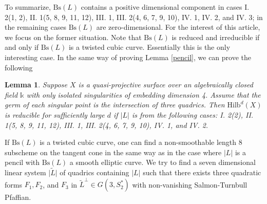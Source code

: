 \documentclass{amsart}[12pt]
\newtheorem{lemma}[theorem]{Lemma}
\theoremstyle{definition}
\theoremstyle{remark}
\numberwithin{equation}{section}
\newcommand{\abs}[1]{\lvert#1\rvert}
\begin{document}
To summarize, $\mathrm{Bs}(L)$ contains a positive dimensional component in cases I. 2(1, 2), II. 1(5, 8, 9, 11, 12), III. 1, III. 2(4, 6, 7, 9, 10), IV. 1, IV. 2, and IV. 3; in the remaining cases $\mathrm{Bs}(L)$ are zero-dimensional. For the interest of this article, we focus on the former situation. Note that $\mathrm{Bs}(L)$ is reduced and irreducible if and only if $\mathrm{Bs}(L)$ is a twisted cubic curve. Essentially this is the only interesting case. In the same way of proving Lemma \ref{pencil}, we can prove the following

\begin{lemma}\label{net}
Suppose $X$ is a quasi-projective surface over an algebraically closed field $\mathbb{k}$ with only isolated singularities of embedding dimension 4. Assume that the germ of each singular point is the intersection of three quadrics. Then $\mathrm{Hilb}^d(X)$ is reducible for sufficiently large $d$ if $\abs{L}$ is from the following cases: I. 2(2), II. 1(5, 8, 9, 11, 12), III. 1, III. 2(4, 6, 7, 9, 10), IV. 1, and IV. 2. 
\end{lemma}

If $\mathrm{Bs}(L)$ is a twisted cubic curve, one can find a non-smoothable length 8 subscheme on the tangent cone in the same way as in the case where $\abs{L}$ is a pencil with $\mathrm{Bs}(L)$ a smooth elliptic curve. We try to find a seven dimensional linear system $\abs{\tilde{L}}$ of quadrics containing $\abs{L}$ such that there exists three quadratic forms $F_1, F_2$, and $F_3$ in $\tilde{L}^{\perp} \in G(3, S_2^*)$ with non-vanishing Salmon-Turnbull Pfaffian. 
\end{document}
